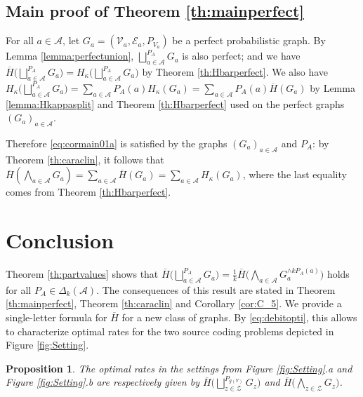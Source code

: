 \documentclass[conference,a4paper]{IEEEtran}
\newtheorem{proposition}[theorem]{Proposition}
\def\ar#1{\textcolor{red}{\footnotesize {(ar: #1)}}}
\begin{document}
\subsection{Main proof of Theorem \ref{th:mainperfect}}

For all $a \in \mathcal{A}$, let $G_a = (\mathcal{V}_a, \mathcal{E}_a, P_{V_a})$ be a perfect probabilistic graph. By Lemma \ref{lemma:perfectunion}, $\bigsqcup_{a \in \mathcal{A}}^{P_A} G_a$ is also perfect; and we have $\overline{H}\big(\bigsqcup_{a \in \mathcal{A}}^{P_A} G_a\big) = H_\kappa\big(\bigsqcup_{a \in \mathcal{A}}^{P_A} G_a\big)$ by Theorem \ref{th:Hbarperfect}. We also have $H_\kappa\big(\bigsqcup_{a \in \mathcal{A}}^{P_A} G_a\big) = \sum_{a \in \mathcal{A}} P_A(a) H_\kappa(G_a) = \sum_{a \in \mathcal{A}} P_A(a) \overline{H}(G_a)$ by Lemma \ref{lemma:Hkappasplit} and Theorem \ref{th:Hbarperfect} used on the perfect graphs $(G_a)_{a \in \mathcal{A}}$.

Therefore \eqref{eq:cormain01a} is satisfied by the graphs $(G_a)_{a \in \mathcal{A}}$ and $P_A$: by Theorem \ref{th:caraclin}, it follows that $\overline{H}\left(\bigwedge_{a \in \mathcal{A}} G_a \right) = \sum_{a \in \mathcal{A}} \overline{H}(G_a) = \sum_{a \in \mathcal{A}} H_\kappa(G_a)$, where the last equality comes from Theorem \ref{th:Hbarperfect}.

\section{Conclusion}

Theorem \ref{th:partvalues} shows that $\overline{H}\big(\bigsqcup_{a \in \mathcal{A}}^{P_A} G_a\big) = \frac{1}{k}\overline{H}\big(\bigwedge_{a \in \mathcal{A}} G_a^{\wedge k P_A(a)}\big)$ holds for all $P_A \in \Delta_k(\mathcal{A})$. The consequences of this result are stated in Theorem \ref{th:mainperfect}, Theorem \ref{th:caraclin} and Corollary \ref{cor:C_5}. We provide a single-letter formula for $\overline{H}$ for a new class of graphs. By \eqref{eq:debitopti}, this allows to characterize optimal rates for the two source coding problems depicted in Figure \ref{fig:Setting}.

\begin{proposition}\label{prop:optimalrate}
    The optimal rates in the settings from Figure \ref{fig:Setting}.a and Figure \ref{fig:Setting}.b are respectively given by $\overline{H}\big(\bigsqcup_{z \in \mathcal{Z}}^{P_{g(Y)}} G_{z}\big)$ and $\overline{H}\big(\bigwedge_{z \in \mathcal{Z}} G_{z}\big)$.
\end{proposition}
\end{document}
